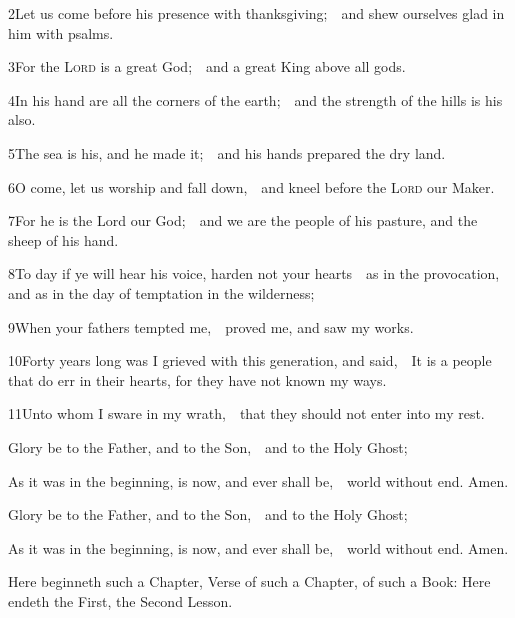 2\enspace Let us come before his presence with thanksgiving;\ \star\ and shew ourselves glad in him with psalms.

3\enspace For the {\scshape Lord} is a great God;\ \star\ and a great King above all gods.

4\enspace In his hand are all the corners of the earth;\ \star\ and the strength of the hills is his also.

5\enspace  The sea is his, and he made it;\ \star\ and his hands prepared the dry land.

6\enspace  O come, let us worship and fall down,\ \star\ and kneel before the {\scshape Lord} our Maker.

7\enspace  For he is the Lord our God;\ \star\ and we are the people of his pasture, and the sheep of his hand.

8\enspace  To day if ye will hear his voice, harden not your hearts\ \star\ as in the provocation, and as in the day of temptation in the wilderness;

9\enspace  When your fathers tempted me,\ \star\ proved me, and saw my works.

10\enspace  Forty years long was I grieved with this generation, and said,\ \star\ It is a people that do err in their hearts, for they have not known my ways.

11\enspace  Unto whom I sware in my wrath,\ \star\ that they should not enter into my rest.

Glory be to the Father, and to the Son,\ \star\ and to the Holy Ghost;

As it was in the beginning, is now, and ever shall be,\ \star\ world without end. Amen.

\bigskip
{}
Glory be to the Father, and to the Son,\ \star\ and to the Holy Ghost;

As it was in the beginning, is now, and ever shall be,\ \star\ world without end. Amen.

\bigskip
{}

Here beginneth such a Chapter,  Verse of such a Chapter, of such a Book:  Here endeth the First,  the Second Lesson.

